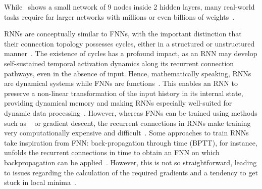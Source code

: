 While~ shows a small network of 9 nodes inside 2 hidden layers, many real-world tasks require far larger networks with millions or even billions of weights~\cite{ImageNet,BLOOM_CarbonFootprint_176Bparam,GPT-J-6B}. \par
RNNs are conceptually similar to FNNs, with the important distinction that their connection topology possesses cycles, either in a structured or unstructured manner~\cite{lukovsevivcius2009reservoir,Hopfield1982}.
The existence of cycles has a profound impact, as an RNN may develop self-sustained temporal activation dynamics along its recurrent connection pathways, even in the absence of input.
Hence, mathematically speaking, RNNs are dynamical systems while FNNs are functions~\cite{lukovsevivcius2009reservoir}. %
This enables an RNN to preserve a non-linear transformation of the input history in its internal state, providing dynamical memory and making RNNs especially well-suited for dynamic data processing~\cite{RC_RecentAdvances,ApproximationRNN}.
However, whereas FNNs can be trained using methods such as ~\cite{Backpropagation} or gradient descent, the recurrent connections in RNNs make training very computationally expensive and difficult~\cite{DifficultyTrainingRNN,EvaluatingRestrictedESNs,Moon_2021,RC_SuperconductingElectronics,funahashi1992neural}.
Some approaches to train RNNs take inspiration from FNN: back-propagation through time (BPTT), for instance, unfolds the recurrent connections in time to obtain an FNN on which backpropagation can be applied~\cite{jaeger2002tutorial}.
However, this is not so straightforward, leading to issues regarding the calculation of the required gradients and a tendency to get stuck in local minima~\cite{RC_Tensegrity,DifficultyTrainingRNN,D-ESN-Improved}. %

\vspace{-1em}
\vspace{-1em}

